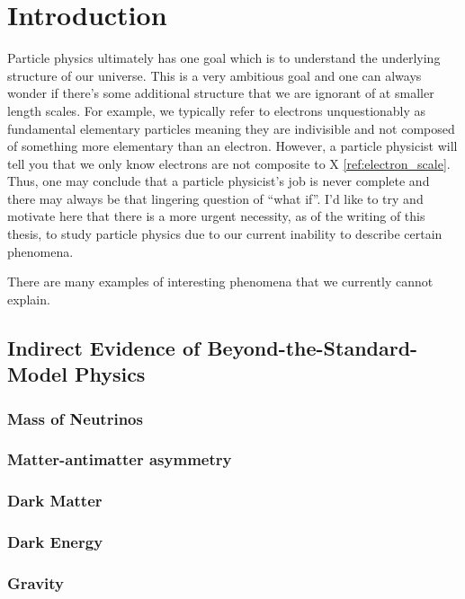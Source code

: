 
\chapter{Introduction}
\label{ch:introduction}

Particle physics ultimately has one goal which is to understand the underlying structure of our universe. This is a very ambitious goal and one can always wonder if there's some additional structure that we are ignorant of at smaller length scales. For example, we typically refer to electrons unquestionably as fundamental elementary particles meaning they are indivisible and not composed of something more elementary than an electron. However, a particle physicist will tell you that we only know electrons are not composite to X \ref{ref:electron_scale}. Thus, one may conclude that a particle physicist's job is never complete and there may always be that lingering question of ``what if''. I'd like to try and motivate here that there is a more urgent necessity, as of the writing of this thesis, to study particle physics due to our current inability to describe certain phenomena.

There are many examples of interesting phenomena that we currently cannot explain.

\section{Indirect Evidence of Beyond-the-Standard-Model Physics}

\subsection{Mass of Neutrinos}

\subsection{Matter-antimatter asymmetry}

\subsection{Dark Matter}

\subsection{Dark Energy}

\subsection{Gravity}

